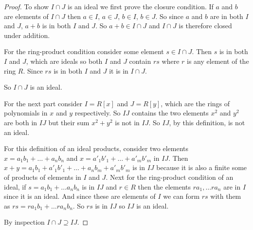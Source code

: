 \documentclass[12pt]{article}
\begin{document}
\begin{proof}

    To show $I \cap J$ is an ideal we first prove the closure condition.
    If $a$ and $b$ are elements of $I \cap J$ then $a \in I$, $a \in J$,
    $b \in  I$, $b \in J$. So since $a$ and $b$ are in both $I$ and $J$,
    $a + b$ is in both $I$ and $J$. So $a + b \in I \cap J$ and $I \cap
    J$ is therefore closed under addition. 

    For the ring-product condition consider some element $s \in I \cap
    J$. Then $s$ is in both $I$ and $J$, which are ideals so both $I$
    and $J$ contain $rs$ where $r$ is any element of the ring $R$. Since
    $rs$ is in both $I$ and $J$ it is in $I \cap J$. 

    So $I \cap J$ is an ideal.

    For the next part consider $I = R[x]$ and $J = R[y]$, which are the
    rings of polynomials in $x$ and $y$ respectively. So $IJ$ contains
    the two elements $x^2$ and $y^2$ are both in $IJ$ but their sum $x^2
    + y^2$ is not in $IJ$. So $IJ$, by this definition, is not an ideal.

    For this definition of an ideal products, consider two elements $x =
    a_1 b_1 + \dots + a_n b_n$ and $x = a'_1 b'_1 + \dots + a'_m b'_m$
    in $IJ$.  Then $x + y = a_1 b_1 + a'_1 b'_1 + \dots + a_n b_m + a'_m
    b'_m$ is in $IJ$ because it is also a finite some of products of
    elements in $I$ and $J$. Next for the ring-product condition of an
    ideal, if $s = a_1 b_1 + \dots a_n b_n$ is in $IJ$ and $r \in R$
    then the elements $ra_1, \dots ra_n$ are in $I$ since it is an
    ideal. And since these are elements of $I$ we can form $rs$ with
    them as $rs = ra_1 b_1 + \dots ra_n b_n$. So $rs$ is in $IJ$ so $IJ$
    is an ideal.

    By inspection $I \cap J \supseteq IJ$.

\end{proof}
\end{document}
